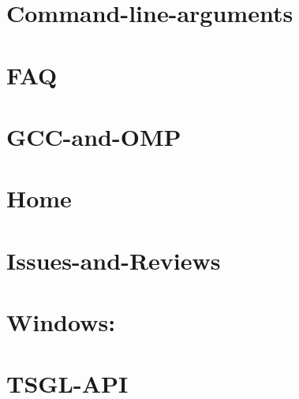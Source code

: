 \documentclass[twoside]{book}
\begin{document}
\chapter{Command-\/line-\/arguments}
\label{md__home_kodemonkey__desktop__t_s_g_l_docs-wiki__command-line-arguments}
\hypertarget{md__home_kodemonkey__desktop__t_s_g_l_docs-wiki__command-line-arguments}{}

\chapter{F\-A\-Q}
\label{md__home_kodemonkey__desktop__t_s_g_l_docs-wiki__f_a_q}
\hypertarget{md__home_kodemonkey__desktop__t_s_g_l_docs-wiki__f_a_q}{}

\chapter{G\-C\-C-\/and-\/\-O\-M\-P}
\label{md__home_kodemonkey__desktop__t_s_g_l_docs-wiki__g_c_c-and-_o_m_p}
\hypertarget{md__home_kodemonkey__desktop__t_s_g_l_docs-wiki__g_c_c-and-_o_m_p}{}

\chapter{Home}
\label{md__home_kodemonkey__desktop__t_s_g_l_docs-wiki__home}
\hypertarget{md__home_kodemonkey__desktop__t_s_g_l_docs-wiki__home}{}

\chapter{Issues-\/and-\/\-Reviews}
\label{md__home_kodemonkey__desktop__t_s_g_l_docs-wiki__issues-and-_reviews}
\hypertarget{md__home_kodemonkey__desktop__t_s_g_l_docs-wiki__issues-and-_reviews}{}

\chapter{Windows\-:}
\label{md__home_kodemonkey__desktop__t_s_g_l_docs-wiki__library-_versions}
\hypertarget{md__home_kodemonkey__desktop__t_s_g_l_docs-wiki__library-_versions}{}

\chapter{T\-S\-G\-L-\/\-A\-P\-I}
\label{md__home_kodemonkey__desktop__t_s_g_l_docs-wiki__t_s_g_l-_a_p_i}
\hypertarget{md__home_kodemonkey__desktop__t_s_g_l_docs-wiki__t_s_g_l-_a_p_i}{}

\end{document}
